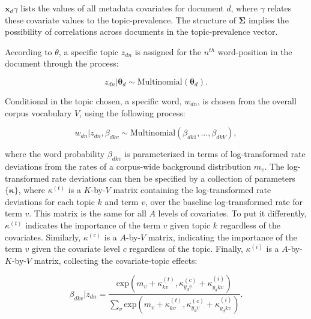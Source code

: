 \documentclass[12pt,a4paper,notitlepage]{article}
\begin{document}
$\boldsymbol{x}_d\gamma$ lists the values of all metadata covariates for document $d$, where $\gamma$ relates these covariate values to the topic-prevalence. The structure of $\boldsymbol{\Sigma}$ implies the possibility of correlations across documents in the topic-prevalence vector. 

According to $\theta$, a specific topic $z_{dn}$ is assigned for the $n^{th}$ word-position in the document through the process:

\begin{equation}
	z_{dn}|\boldsymbol{\theta}_d \sim \textrm{Multinomial}(\boldsymbol{\theta}_d).
\end{equation}

Conditional in the topic chosen, a specific word, $w_{dn}$, is chosen from the overall corpus vocabulary $V$, using the following process:

\begin{equation}
	w_{dn}|z_{dn},\beta_{dkv} \sim \textrm{Multinomial}(\beta_{dk1},...,\beta_{dkV}),
\end{equation}

where the word probability $\beta_{dkv}$ is parameterized in terms of log-transformed rate deviations from the rates of a corpus-wide background distribution $m_v$. The log-transformed rate deviations can then be specified by a collection of parameters $\lbrace \boldsymbol{\kappa} \rbrace$, where $\kappa^{(t)}$ is a $K$-by-$V$ matrix containing the log-transformed rate deviations for each topic $k$ and term $v$, over the baseline log-transformed rate for term $v$. This matrix is the same for all $A$ levels of covariates. To put it differently, $\kappa^{(t)}$ indicates the importance of the term $v$ given topic $k$ regardless of the covariates. Similarly, $\kappa^{(c)}$ is a $A$-by-$V$ matrix, indicating the importance of the term $v$ given the covariate level $c$ regardless of the topic. Finally, $\kappa^{(i)}$ is a $A$-by-$K$-by-$V$ matrix, collecting the covariate-topic effects:

\begin{equation}
	\beta_{dkv}|z_{dn}=\frac{\textrm{exp}(m_v+\kappa^{(t)}_{kv},\kappa^{(c)}_{y_dv}+\kappa^{(i)}_{y_dkv})}{\sum_v \textrm{exp}(m_v+\kappa^{(t)}_{kv},\kappa^{(c)}_{y_dv}+\kappa^{(i)}_{y_dkv})}.
\end{equation}
\end{document}

